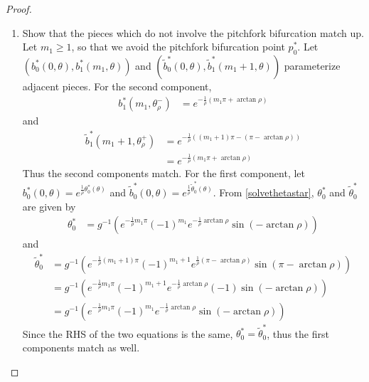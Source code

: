 \documentclass[thesis.tex]{subfiles}
\begin{document}
\begin{lemma}
\begin{proof}
\begin{enumerate}
\begin{enumerate}
	\item Show that the pieces which do not involve the pitchfork bifurcation match up. Let $m_1 \geq 1$, so that we avoid the pitchfork bifurcation point $p_0^*$. Let $(b^*_0(0, \theta), b^*_1(m_1, \theta))$ and $(\tilde{b}^*_0(0, \theta), \tilde{b}^*_1(m_1 + 1, \theta))$ parameterize adjacent pieces. For the second component,
	\begin{align*}
	b_1^*(m_1, \theta_\rho^-) &= e^{ -\frac{1}{\rho}(m_1 \pi + \arctan \rho) }
	\end{align*}
	and
	\begin{align*}
	\tilde{b}_1^*(m_1 + 1, \theta_\rho^+) 
	&= e^{ -\frac{1}{\rho}((m_1+1) \pi - (\pi - \arctan \rho)) } \\
	&= e^{ -\frac{1}{\rho}(m_1 \pi + \arctan \rho) }
	\end{align*}
	Thus the second components match. For the first component, let $b_0^*(0, \theta) = e^{ \frac{1}{\rho} \theta_0^*(\theta) }$ and $\tilde{b}_0^*(0, \theta) = e^{ \frac{1}{\rho} \tilde{\theta}_0^*(\theta) }$. From \eqref{solvethetastar}, $\theta_0^*$ and $\tilde{\theta}_0^*$ are given by
	\begin{align*}
	\theta_0^* &= g^{-1}\left( e^{ -\frac{1}{\rho} m_1 \pi } (-1)^{m_1}  e^{ -\frac{1}{\rho} \arctan \rho } \sin(-\arctan \rho) \right)
	\end{align*}
	and
	\begin{align*}
	\tilde{\theta}_0^* &= g^{-1}\left( e^{ -\frac{1}{\rho} (m_1+1) \pi } (-1)^{m_1+1}  e^{ \frac{1}{\rho} (\pi - \arctan \rho) } \sin(\pi - \arctan \rho) \right) \\
	&= g^{-1}\left( e^{ -\frac{1}{\rho} m_1 \pi } (-1)^{m_1+1} e^{-\frac{1}{\rho} \arctan \rho } (-1) \sin(- \arctan \rho) \right) \\
	&= g^{-1}\left( e^{ -\frac{1}{\rho} m_1 \pi } (-1)^{m_1} e^{-\frac{1}{\rho} \arctan \rho } \sin(-\arctan \rho) \right)
	\end{align*}
	Since the RHS of the two equations is the same, $\theta_0^* = \tilde{\theta}_0^*$, thus the first components match as well.


\end{enumerate}
\end{enumerate}
\end{proof}
\end{lemma}
\end{document}
